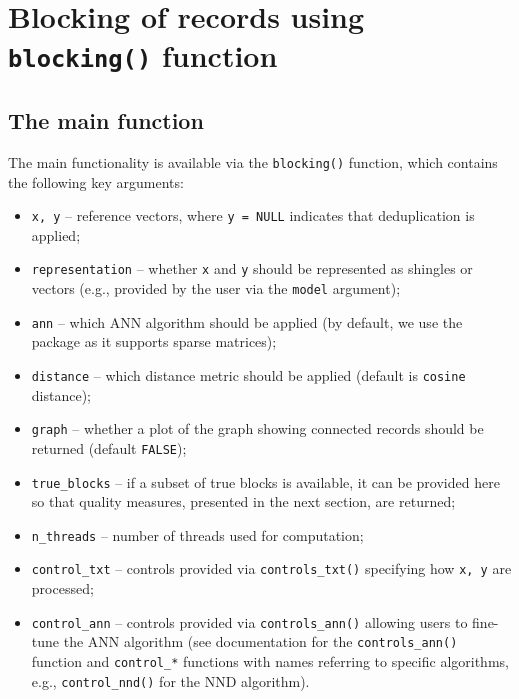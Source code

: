 \section{\texorpdfstring{Blocking of records using \texttt{blocking()} function}{Blocking of records using blocking() function}}\label{sec-blocks}

\subsection{The main function}\label{the-main-function}

The main functionality is available via the \texttt{blocking()} function, which
contains the following key arguments:

\begin{itemize}
\tightlist
\item
  \texttt{x,\ y} -- reference vectors, where \texttt{y\ =\ NULL} indicates that
  deduplication is applied;
\item
  \texttt{representation} -- whether \texttt{x} and \texttt{y} should be represented as
  shingles or vectors (e.g., provided by the user via the \texttt{model}
  argument);
\item
  \texttt{ann} -- which ANN algorithm should be applied (by default, we use
  the  package as it supports sparse matrices);
\item
  \texttt{distance} -- which distance metric should be applied (default is
  \texttt{cosine} distance);
\item
  \texttt{graph} -- whether a plot of the graph showing connected records
  should be returned (default \texttt{FALSE});
\item
  \texttt{true\_blocks} -- if a subset of true blocks is available, it can be
  provided here so that quality measures, presented in the next
  section, are returned;
\item
  \texttt{n\_threads} -- number of threads used for computation;
\item
  \texttt{control\_txt} -- controls provided via \texttt{controls\_txt()} specifying
  how \texttt{x,\ y} are processed;
\item
  \texttt{control\_ann} -- controls provided via \texttt{controls\_ann()} allowing
  users to fine-tune the ANN algorithm (see documentation for the
  \texttt{controls\_ann()} function and \texttt{control\_*} functions with names
  referring to specific algorithms, e.g., \texttt{control\_nnd()} for the NND
  algorithm).
\end{itemize}

